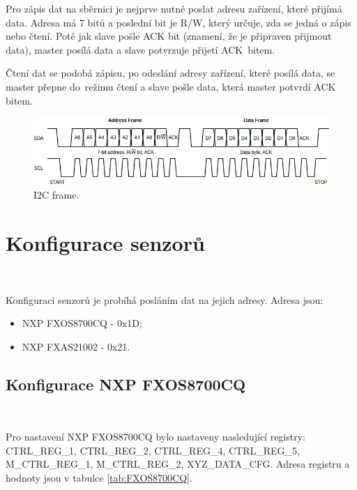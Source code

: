 Pro zápis dat na sběrnici je nejprve nutné poslat adresu zařízení, které přijímá
data. Adresa má 7 bitů a poslední bit je R/W, který určuje, zda se jedná o zápis
nebo čtení. Poté jak slave pošle ACK bit (znamení, že je připraven přijmout data),
master posílá data a slave potvrzuje přijetí ACK~bitem.

Čtení dat se podobá zápisu, po odeslání adresy zařízení, které posílá data, se
master přepne do~režimu čtení a slave pošle data, která master potvrdí ACK
bitem\cite{I2C}.

\begin{figure}[!h]
    \centering
    \includegraphics[width = .9\linewidth]{Figures/I2C_FRAME.png}
    \caption{I2C frame\cite{I2C}.}
    \label{fig:I2C_FRAME}
\end{figure}

\section{Konfigurace senzorů}\

Konfiguraci senzorů je probíhá posláním dat na jejich adresy. Adresa
jsou:
\begin{itemize}
    \item NXP FXOS8700CQ - 0x1D;
    \item NXP FXAS21002 - 0x21.
\end{itemize}

\subsection{Konfigurace NXP FXOS8700CQ}\

Pro nastavení NXP FXOS8700CQ bylo nastaveny nasledující registry: CTRL\_REG\_1,
CTRL\_REG\_2, CTRL\_REG\_4, CTRL\_REG\_5, M\_CTRL\_REG\_1, M\_CTRL\_REG\_2,
XYZ\_DATA\_CFG. Adresa registru a hodnoty jsou v tabulce \ref{tab:FXOS8700CQ}.

